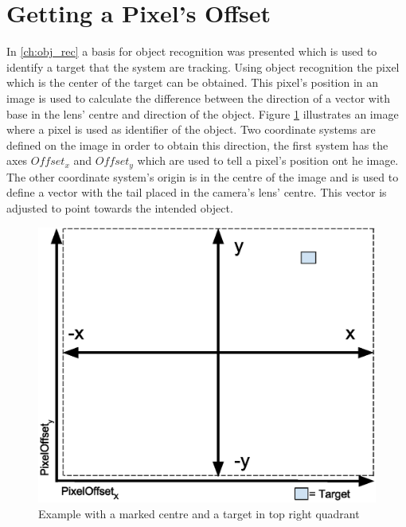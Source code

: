 \section{Getting a Pixel's Offset}\label{ssc:xy_angles}
In \cref{ch:obj_rec} a basis for object recognition was presented which is used to identify a target that the system are tracking. Using object recognition the pixel which is the center of the target can be obtained. This pixel's position in an image is used to calculate the difference between the direction of a vector with base in the lens' centre and direction of the object. Figure \ref{fig:calculating_angles} illustrates an image where a pixel is used as identifier of the object. Two coordinate systems are defined on the image in order to obtain this direction, the first system has the axes $Offset_x$ and $Offset_y$ which are used to tell a pixel's position ont he image. The other coordinate system's origin is in the centre of the image and is used to define a vector with the tail placed in the camera's lens' centre. This vector is adjusted to point towards the intended object.

\begin{figure}[ht]
    \centering
    \includegraphics[scale=0.65]{graphics/signed_angles_simple.eps}
    \caption{Example with a marked centre and a target in top right quadrant}
    \label{fig:calculating_angles}
\end{figure}


